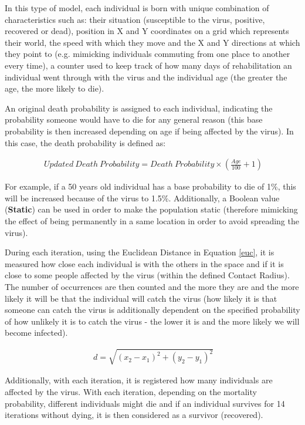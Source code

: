 In this type of model, each individual is born with unique combination of characteristics such as: their situation (susceptible to the virus, positive, recovered or dead), position in X and Y coordinates on a grid which represents their world, the speed with which they move and the X and Y directions at which they point to (e.g. mimicking individuals commuting from one place to another every time), a counter used to keep track of how many days of rehabilitation an individual went through with the virus and the individual age (the greater the age, the more likely to die). 

An original death probability is assigned to each individual, indicating the probability someone would have to die for any general reason (this base probability is then increased depending on age if being affected by the virus). In this case, the death probability is defined as:

\useshortskip
\begin{align}
\ Updated\:Death\:Probability = Death\:Probability \times (\frac{Age}{100} + 1) 
\end{align}
\useshortskip

For example, if a 50 years old individual has a base probability to die of 1\%, this will be increased because of the virus to 1.5\%. Additionally, a Boolean value (\textbf{Static}) can be used in order to make the population static (therefore mimicking the effect of being permanently in a same location in order to avoid spreading the virus).

During each iteration, using the Euclidean Distance in Equation \ref{euc}, it is measured how close each individual is with the others in the space and if it is close to some people affected by the virus (within the defined Contact Radius). The number of occurrences are then counted and the more they are and the more likely it will be that the individual will catch the virus (how likely it is that someone can catch the virus is additionally dependent on the specified probability of how unlikely it is to catch the virus - the lower it is and the more likely we will become infected).

\useshortskip
\begin{align}
\ d = \sqrt{(x_{2}-x_{1})^{2}+(y_{2}-y_{1})^{2}}
\label{euc}
\end{align}
\useshortskip

Additionally, with each iteration, it is registered how many individuals are affected by the virus. With each iteration, depending on the mortality probability, different individuals might die and if an individual survives for 14 iterations without dying, it is then considered as a survivor (recovered).

